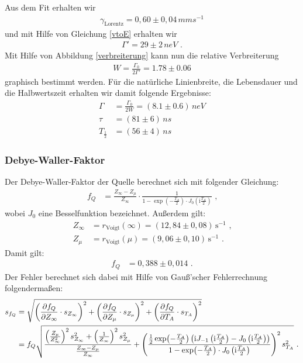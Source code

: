 
Aus dem Fit erhalten wir \begin{align}\gamma_\mathrm{Lorentz}=0,60\pm0,04\,\si{mms^{-1}}\end{align} und mit Hilfe von Gleichung \ref{vtoE} erhalten wir \begin{align}\Gamma'=29\pm2\,\si{neV}\text{ .}\end{align} Mit Hilfe von Abbildung \ref{verbreiterung} kann nun die relative Verbreiterung \begin{align}W=\frac{\Gamma_0}{2\Gamma'}=1.78\pm0.06\end{align} graphisch bestimmt werden. Für die natürliche Linienbreite, die Lebensdauer und die Halbwertszeit erhalten wir damit folgende Ergebnisse:
\begin{align}
	\Gamma&=\frac{\Gamma_0}{2W}=(8.1\pm0.6)\,\si{neV}\\
	\tau&=(81\pm6)\,\si{ns}\\
	T_{\frac12}&=(56\pm4)\,\si{ns}
\end{align}
\subsubsection{Debye-Waller-Faktor}
Der Debye-Waller-Faktor der Quelle berechnet sich mit folgender Gleichung:
\begin{align}
	f_Q&=\frac{Z_\infty-Z_\mu}{Z_\infty}\cdot\frac1{1-\exp(-\frac{T_A}2)\cdot J_0\left(\mathrm{i}\frac{T_A}2\right)}\text{ ,}
\end{align}
wobei $J_0$ eine Besselfunktion bezeichnet. Außerdem gilt:
\begin{align}
	Z_\infty&=r_\mathrm{Voigt}(\infty)=(12,84\pm0,08)\,\mathrm{s^{-1}}\text{ ,}\\
	Z_\mu&=r_\mathrm{Voigt}(\mu)=(9,06\pm0,10)\,\mathrm{s^{-1}}\text{ .}
\end{align}
Damit gilt:
\begin{align}
	f_Q&=0,388\pm0,014\text{ .}
\end{align}
Der Fehler berechnet sich dabei mit Hilfe von Gauß'scher Fehlerrechnung folgendermaßen:
\begin{align}
	s_{f_Q}&=\sqrt{\left(\del[f_Q]{Z_\infty}\cdot s_{Z_\infty}\right)^2+\left(\del[f_Q]{Z_\mu}\cdot s_{Z_\mu}\right)^2+\left(\del[f_Q]{T_A}\cdot s_{T_A}\right)^2}\\
	&=f_Q\sqrt{\frac{\left(\frac{Z_\mu}{Z_\infty^2}\right)^2s_{Z_\infty}^2+\left(\frac{1}{Z_\infty}\right)^2s_{Z_\mu}^2}{\frac{Z_\infty-Z_\mu}{Z_\infty}}+\left(\frac{\frac12\exp(-\frac{T_A}{2})\left(\mathrm{i}J_{-1}\left(\mathrm{i}\frac{T_A}2\right)-J_{0}\left(\mathrm{i}\frac{T_A}2\right)\right)}{1-\exp(-\frac{T_A}2)\cdot J_0\left(\mathrm{i}\frac{T_A}2\right)}\right)^2s_{T_A}^2}\text{ .}
\end{align}


